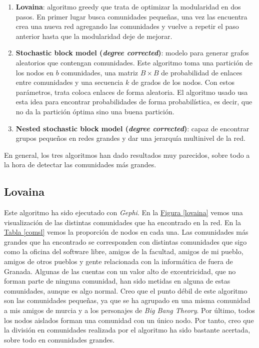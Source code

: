 \documentclass[10pt,a4paper,spanish]{article}
\numberwithin{equation}{section} %
\numberwithin{figure}{section} %
\numberwithin{table}{section} %
\begin{document}
\begin{enumerate}[$\bullet$]
    \item \textbf{Lovaina}: algoritmo greedy que trata de optimizar la modularidad en dos pasos. En primer lugar busca comunidades pequeñas, una vez las encuentra crea una nueva red agregando las comunidades y vuelve a repetir el paso anterior hasta que la modularidad deje de mejorar.
    \item \textbf{Stochastic block model (\textit{degree corrected})}: modelo para generar grafos aleatorios que contengan comunidades. Este algoritmo toma una partición de los nodos en $b$ comunidades, una matriz $B \times B$ de probabilidad de enlaces entre comunidades y una secuencia $k$ de grados de los nodos. Con estos parámetros, trata coloca enlaces de forma aleatoria. El algoritmo usado usa esta idea para encontrar probabilidades de forma probabilística, es decir, que no da la partición óptima sino una buena partición.
    \item \textbf{Nested stochastic block model (\textit{degree corrected})}: capaz de encontrar grupos pequeños en redes grandes y dar una jerarquía multinivel de la red. 
\end{enumerate}

En general, los tres algoritmos han dado resultados muy parecidos, sobre todo a la hora de detectar las comunidades más grandes.

\subsection{Lovaina}
Este algoritmo ha sido ejecutado con \textit{Gephi}. En la \hyperref[lovaina]{Figura \ref*{lovaina}} vemos una visualización de las distintas comunidades que ha encontrado en la red. En la \hyperref[comsl]{Tabla \ref*{comsl}} vemos la proporción de nodos en cada una. Las comunidades más grandes que ha encontrado se corresponden con distintas comunidades que sigo como la oficina del software libre, amigos de la facultad, amigos de mi pueblo, amigos de otros pueblos y gente relacionada con la informática de fuera de Granada. Algunas de las cuentas con un valor alto de excentricidad, que no forman parte de ninguna comunidad, han sido metidas en alguna de estas comunidades, aunque es algo normal. Creo que el punto débil de este algoritmo son las comunidades pequeñas, ya que se ha agrupado en una misma comunidad a mis amigos de murcia y a los personajes de \textit{Big Bang Theory}. Por último, todos los nodos aislados forman una comunidad con un único nodo. Por tanto, creo que la división en comunidades realizada por el algoritmo ha sido bastante acertada, sobre todo en comunidades grandes. 
\end{document}
